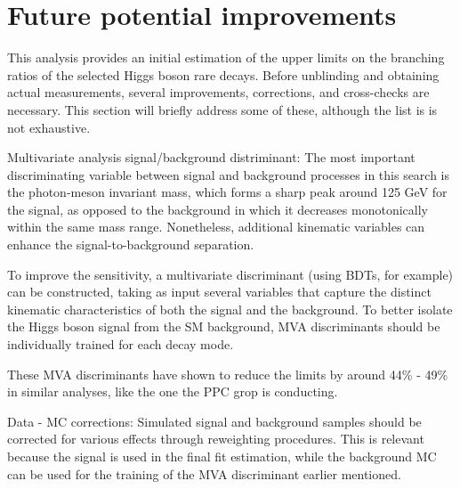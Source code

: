 
\section{Future potential improvements}\label{sec:future_improvements}

This analysis provides an initial estimation of the upper limits on the branching ratios of the selected Higgs boson rare decays. Before unblinding and obtaining actual measurements, several improvements, corrections, and cross-checks are necessary. This section will briefly address some of these, although the list is is not exhaustive.
\vspace*{-6pt}
\begin{myitemlist}
    \item[Multivariate analysis signal/background distriminant:] The most important discriminating variable between signal and background processes in this search is the photon-meson invariant mass, which forms a sharp peak around 125 GeV for the signal, as opposed to the background in which it decreases monotonically within the same mass range. Nonetheless, additional kinematic variables can enhance the signal-to-background separation.
    
    To improve the sensitivity, a multivariate discriminant (using BDTs, for example) can be constructed, taking as input several variables that capture the distinct kinematic characteristics of both the signal and the background. To better isolate the Higgs boson signal from the SM background, MVA discriminants should be individually trained for each decay mode.

    These MVA discriminants have shown to reduce the limits by around 44\% - 49\% in similar analyses, like the one the PPC grop is conducting.

    \item[Data - MC corrections:] Simulated signal and background samples should be corrected for various effects through reweighting procedures. This is relevant because the signal is used in the final fit estimation, while the background MC can be used for the training of the MVA discriminant earlier mentioned.
\iffalse
\end{myitemlist}
